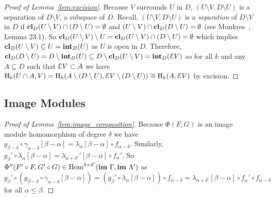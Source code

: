 \begin{proof}[Proof of Lemma~\ref{lem:excision}]
  Because $V$ surrounds $U$ in $D$, $(U\setminus V, D\setminus U)$ is a separation of $D\setminus V$, a subspace of $D$.
  Recall, $(U\setminus V, D\setminus U)$ is a \emph{separation} of $D\setminus V$ in $D$ if $\mathbf{cl}_D(U\setminus V)\cap (D\setminus U) = \emptyset$ and $(U\setminus V)\cap \mathbf{cl}_D(D\setminus U) = \emptyset$ (see Munkres~\cite{munkres00topology}, Lemma 23.1).
  So $\mathbf{cl}_D(U\setminus V)\setminus U = \mathbf{cl}_D(U\setminus V) \cap (D\setminus U) = \emptyset$ which implies $\mathbf{cl}_D(U\setminus V)\subseteq U = \mathbf{int}_D(U)$ as $U$ is open in $D$.
  Therefore, $\mathbf{cl}_D(D\setminus U) = D\setminus \mathbf{int}_D(U)\subseteq D\setminus \mathbf{cl}_D(U\setminus V) = \mathbf{int}_D(\mathcal{E} V)$
  so for all $k$ and any $A\subseteq D$ such that $\mathcal{E} V\subset A$ we have $\mathrm{H}_k(U\cap A, V) = \mathrm{H}_k(A\setminus (D\setminus U), \mathcal{E} V\setminus (D\setminus U)) \cong \mathrm{H}_k(A, \mathcal{E} V)$
   by excision.
\end{proof}

\subsection{Image Modules}

\begin{proof}[Proof of Lemma~\ref{lem:image_composition}]
  Because $\Phi(F, G)$ is an image module homomorphism of degree $\delta$ we have $g_{\beta-\delta}\circ\gamma_{\alpha-\delta}[\beta-\alpha] = \lambda_\alpha[\beta-\alpha]\circ f_{\alpha-\delta}$.
  Similarly, $g_{\beta}'\circ\lambda_{\alpha}[\beta-\alpha] = \lambda_{\alpha +\delta'}'[\beta-\alpha]\circ f_{\alpha}'$.
  So $\Phi''(F'\circ F, G'\circ G)\in\mathrm{Hom}^{\delta+\delta'}(\mathbf{im}~\Gamma,\mathbf{im}~\Lambda')$ as
  \[ g_\beta'\circ (g_{\beta-\delta}\circ \gamma_{\alpha-\delta}[\beta-\alpha]) = (g_\beta'\circ \lambda_\alpha[\beta-\alpha])\circ f_{\alpha-\delta} =\lambda_{\alpha+\delta'}[\beta-\alpha]\circ f_\alpha'\circ f_{\alpha-\delta}\]
  for all $\alpha\leq\beta$.
\end{proof}

